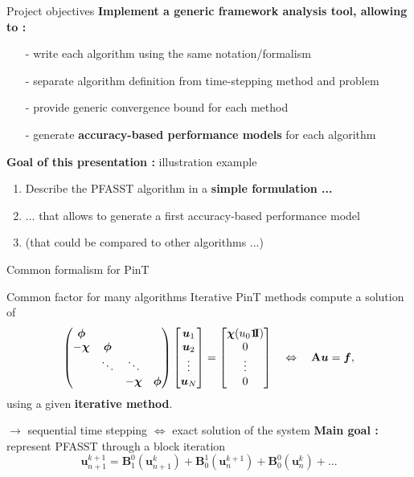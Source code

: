 \documentclass[11pt,aspectratio=43]{beamer}
\newcommand{\ones}{\mbox{1\hspace{-0.2em}I}}
\newcommand{\matr}[1]{\mathbf{#1}}
\newcommand{\vect}[1]{\boldsymbol{#1}}
\newcommand{\uvect}{\vect{u}}
\newcommand{\BMat}{\matr{B}}
\begin{document}
\begin{frame}{Project objectives}
	\textbf{Implement a generic framework analysis tool, allowing to :}
    \begin{enumerate}
        \item[-] write each algorithm using the same notation/formalism
        \item[-] separate algorithm definition from time-stepping method and problem
        \item[-] provide generic convergence bound for each method
        \item[-] generate \textbf{accuracy-based performance models} for each algorithm
    \end{enumerate}\vskip30pt
	
	\textbf{Goal of this presentation :} illustration example
	\begin{enumerate}
		\item Describe the PFASST algorithm in a \textbf{simple formulation ...}
		\item ... that allows to generate a first accuracy-based performance model
		\item (that could be compared to other algorithms ...)
	\end{enumerate}
\end{frame}

\begin{frame}{Common formalism for PinT}\vskip10pt
    \begin{block}{Common factor for many algorithms}
    Iterative PinT methods compute a solution of 
    $$
    \begin{pmatrix}
        \bm{\phi} & & &\\
        -\bm{\chi} & \bm{\phi} & &\\
        & \ddots & \ddots &\\
        & & -\bm{\chi} & \bm{\phi}
    \end{pmatrix}
    \begin{bmatrix}
        \uvect_1\\\uvect_2\\\vdots\\\uvect_N
    \end{bmatrix}
    =
    \begin{bmatrix}
        \bm{\chi}(u_0\vect{\ones})\\0\\\vdots\\0
    \end{bmatrix}
    \quad \Leftrightarrow \quad 
    \matr{A}\uvect = \vect{f},$$
    using a given \textbf{iterative method}.
    \end{block}
	$\rightarrow$ sequential time stepping $\Leftrightarrow$ exact solution of the system\vskip20pt
	\textbf{Main goal :} represent PFASST through a block iteration
	$$
	\uvect^{k+1}_{n+1} = \BMat^0_1(\uvect^k_{n+1})
	+ \BMat^1_0(\uvect^{k+1}_{n}) + \BMat^0_0(\uvect^{k}_{n}) + ...
	$$
\end{frame}
\end{document}
